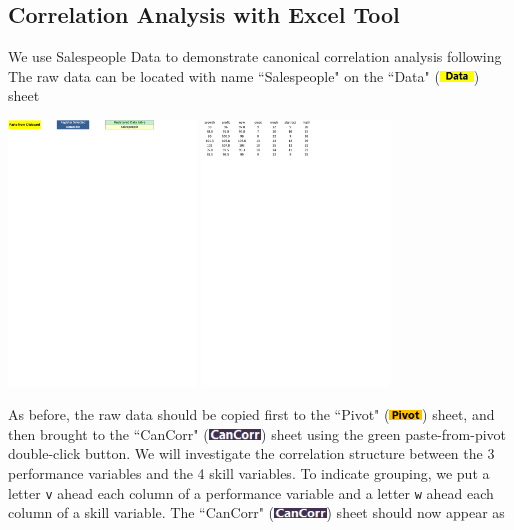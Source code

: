 \documentclass[article]{jss}
\newcommand{\shtData}{``Data" (\includegraphics[height=8pt, keepaspectratio=true]{DataSheetTab_png}) }
\newcommand{\shtPivot}{``Pivot" (\includegraphics[height=8pt, keepaspectratio=true]{PivotSheetTab_png}) }
\newcommand{\shtCanCorr}{``CanCorr" (\includegraphics[height=8pt, keepaspectratio=true]{CanCorrSheetTab_png}) }
\begin{document}
        \subsection[egCCA]{Correlation Analysis with Excel Tool}
        We use Salespeople Data to demonstrate canonical correlation analysis following \cite{anderson2003introMVA3e} The raw data can be located with name ``Salespeople" on the \shtData sheet 
            \begin{center}
              \includegraphics[height=200pt, keepaspectratio=true]{img/DataSheet_Salespeople}
              \includegraphics[height=200pt, keepaspectratio=true]{img/DataSheet_Salespeople2}
            \end{center}
        As before, the raw data should be copied first to the \shtPivot sheet, and then brought to the \shtCanCorr sheet using the green paste-from-pivot double-click button. We will investigate the correlation structure between the 3 performance variables and the 4 skill variables. To indicate grouping, we put a letter \texttt{v} ahead each column of a performance variable and a letter \texttt{w} ahead each column of a skill variable. The \shtCanCorr sheet should now appear as
\end{document}
